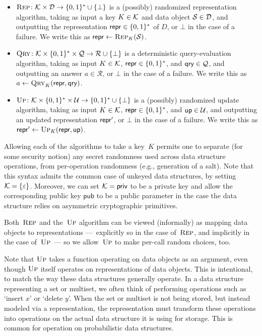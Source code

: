 \begin{itemize}[leftmargin=.2in]
  \item $\textnormal{\textsc{Rep}}\colon \mathcal{K} \times \mathcal{D} \to \{0,1\}^* \cup \{\bot\}$ is a
  (possibly) randomized representation algorithm, taking as input a key $K \in
  \mathcal{K}$ and data object $\mathcal{S} \in \mathcal{D}$, and outputting the
  representation $\mathsf{repr} \in \{0,1\}^*$ of $D$, or $\bot$ in the case of a
  failure. We write this as $\mathsf{repr} \gets \textnormal{\textsc{Rep}}_K(\mathcal{S})$.
%
  \item $\textnormal{\textsc{Qry}}\colon \mathcal{K} \times \{0,1\}^* \times \mathcal{Q} \to \mathcal{R} \cup \{\bot\}$
  is a deterministic query-evaluation algorithm, taking as input $K \in
  \mathcal{K}$, $\mathsf{repr} \in \{0,1\}^*$, and $\mathsf{qry} \in \mathcal{Q}$, and outputting an
  answer $a \in \mathcal{R}$, or $\bot$ in the case of a failure. We write this as $a \gets \textnormal{\textsc{Qry}}_K(\mathsf{repr},\mathsf{qry})$.
%
  \item $\textnormal{\textsc{Up}}\colon \mathcal{K} \times \{0,1\}^* \times \mathcal{U} \to \{0,1\}^* \cup
  \{\bot\}$ is a (possibly) randomized update algorithm, taking as input $K \in
  \mathcal{K}$, $\mathsf{repr} \in \{0,1\}^*$, and $\mathsf{up} \in \mathcal{U}$, and outputting an
  updated representation $\mathsf{repr}'$, or $\bot$ in the case of a failure. We write
  this as $\mathsf{repr}' \gets \textnormal{\textsc{Up}}_K(\mathsf{repr},\mathsf{up})$.
\end{itemize}

Allowing each of the algorithms to take a key~$K$ permits one to separate (for some
security notion) any secret randomness used across data structure operations,
from per-operation randomness (e.g., generation of a salt). Note that this syntax admits the
common case of unkeyed data structures, by setting
$\mathcal{K}=\{\varepsilon\}$. Moreover, we can set $\mathcal{K}=\mathsf{priv}$ to be a private key and allow the corresponding public key $\mathsf{pub}$ to be a public parameter in the case the data structure relies on asymmetric cryptographic primitives.  

Both~$\textnormal{\textsc{Rep}}$ and the~$\textnormal{\textsc{Up}}$ algorithm can be viewed (informally) as mapping data
objects to representations ---~explicitly so in the case of~$\textnormal{\textsc{Rep}}$, and
implicitly in the case of~$\textnormal{\textsc{Up}}$~--- so we allow~$\textnormal{\textsc{Up}}$ to make per-call random
choices, too. 

Note that $\textnormal{\textsc{Up}}$ takes a function operating on data objects as an argument, even
though $\textnormal{\textsc{Up}}$ itself operates on representations of data objects. This is
intentional, to match the way these data structures generally operate.
In a data structure representing a set or multiset, we often think of performing
operations such as `insert $x$' or `delete $y$'. When the set or multiset is not
being stored, but instead modeled via a representation, the representation must
transform these operations into operations on the actual data structure it is
using for storage. This is common for operation on probabilistic data structures. 

